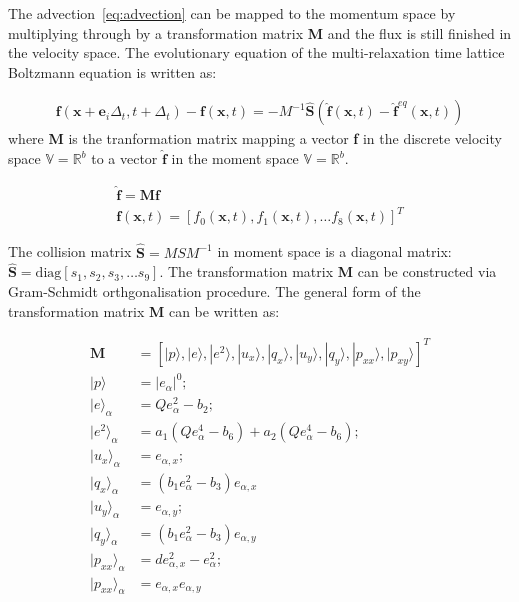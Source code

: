 \noindent The advection~\cref{eq:advection} can be mapped to the momentum 
space by multiplying through by a transformation matrix \textbf{M} and the flux 
is still finished in the velocity space. The evolutionary equation of the 
multi-relaxation time lattice Boltzmann equation is written as:

\begin{gather}
\mathbf{f}(\mathbf{x}+\mathbf{e}_i\Delta_t, t+ 
\Delta_t)-\mathbf{f}(\mathbf{x},t)=-M^{-1}\hat{\mathbf{S}}(\hat{\mathbf{f}}
(\mathbf{x},t)-\hat{\mathbf{f}}^{eq}(\mathbf{x},t))
\end{gather}
\noindent where \textbf{M} is the tranformation matrix mapping a vector 
\textbf{f} in the discrete velocity space $\mathds{V}=\mathds{R}^b$ to a vector 
$\hat{\mathbf{f}}$ in the moment space $\mathds{V}=\mathds{R}^b$. 

\begin{gather}
\nonumber
\hat{\mathbf{f}}= \mathbf{M}\mathbf{f} \\ 
\nonumber
\mathbf{f}(\mathbf{x},t) =\left[f_0(\mathbf{x},t),f_1(\mathbf{x},t),\dots f_8(\mathbf{x},t)\right]^T
\end{gather}

The collision matrix $\hat{\mathbf{S}} = MSM^{-1}$ in moment space is a 
diagonal matrix: $\hat{\mathbf{S}} =\mbox{diag} \left[ s_1, s_2, s_3,\dots s_9  
\right]$. The transformation matrix \textbf{M} can be constructed via 
Gram-Schmidt orthgonalisation procedure. The general form of the transformation 
matrix \textbf{M} can be written as:

\begin{align}
\mathbf{M} & =  
\left[|p\rangle,|e\rangle,|e^2\rangle,|u_x\rangle,|q_x\rangle,|u_y\rangle,
			|q_y\rangle,|p_{xx}\rangle,|p_{xy}\rangle\right]^T \\
|p\rangle & =  |\mathit{e}_{\alpha}|^0;\\
|e\rangle_{\alpha} & = \mathit{Q}e_{\alpha}^2-b_2;\\
|e^2\rangle_{\alpha} & =  	
		a_1(\mathit{Q}e_{\alpha}^4-b_6)+a_2(\mathit{Q}e_{\alpha}^4-b_6);\\
|u_x\rangle_{\alpha} & = e_{\alpha,x}; \\
|q_x\rangle_{\alpha} & = (\mathit{b}_1e_{\alpha}^2-b_3)e_{\alpha,x}\\
|u_y\rangle_{\alpha} & = e_{\alpha,y}; \\
|q_y\rangle_{\alpha} & = (\mathit{b}_1e_{\alpha}^2-b_3)e_{\alpha,y}\\
|p_{xx}\rangle_{\alpha} & = \mathit{d}e_{\alpha,x}^2-e_{\alpha}^2; \\
|p_{xx}\rangle_{\alpha}  & = e_{\alpha,x}e_{\alpha,y}
\end{align}

